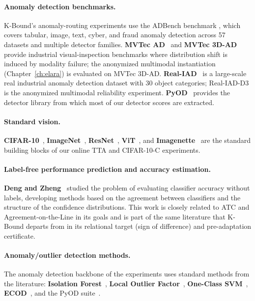\paragraph{Anomaly detection benchmarks.}
K-Bound's anomaly-routing experiments use the ADBench benchmark
\cite{han2022adbench}, which covers tabular, image, text, cyber, and fraud
anomaly detection across 57 datasets and multiple detector families.
\textbf{MVTec AD}~\cite{bergmann2019mvtec} and
\textbf{MVTec 3D-AD}~\cite{bergmann2022mvtec3d} provide industrial
visual-inspection benchmarks where distribution shift is induced by modality
failure; the anonymized multimodal instantiation (Chapter~\ref{ch:elara}) is evaluated
on MVTec 3D-AD.
\textbf{Real-IAD}~\cite{wang2024realiad} is a large-scale real industrial
anomaly detection dataset with 30 object categories; Real-IAD-D3 is the
anonymized multimodal reliability experiment.
\textbf{PyOD}~\cite{zhao2019pyod} provides the detector library from which
most of our detector scores are extracted.

\paragraph{Standard vision.}
\textbf{CIFAR-10}~\cite{krizhevsky2009cifar}, \textbf{ImageNet}~\cite{deng2009imagenet},
\textbf{ResNet}~\cite{he2016resnet}, \textbf{ViT}~\cite{dosovitskiy2021vit},
and \textbf{Imagenette}~\cite{howard2019imagenette} are the standard
building blocks of our online TTA and CIFAR-10-C experiments.

\paragraph{Label-free performance prediction and accuracy estimation.}
\textbf{Deng and Zheng}~\cite{deng2021labels} studied the problem of evaluating
classifier accuracy without labels, developing methods based on the agreement
between classifiers and the structure of the confidence distributions.
This work is closely related to ATC \cite{garg2022atc} and Agreement-on-the-Line
\cite{baek2022agreement} in its goals and is part of the same literature that
K-Bound departs from in its relational target (sign of difference) and
pre-adaptation certificate.

\paragraph{Anomaly/outlier detection methods.}
The anomaly detection backbone of the experiments uses standard methods from
the literature: \textbf{Isolation Forest}~\cite{liu2008isolation},
\textbf{Local Outlier Factor}~\cite{breunig2000lof},
\textbf{One-Class SVM}~\cite{scholkopf2001estimating},
\textbf{ECOD}~\cite{li2022ecod}, and the PyOD suite~\cite{zhao2019pyod}.

